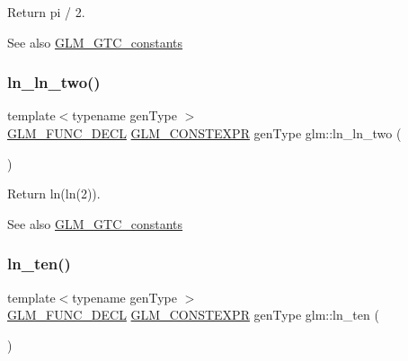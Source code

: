Return pi / 2. \begin{DoxySeeAlso}{See also}
\mbox{\hyperlink{group__gtc__constants}{G\+L\+M\+\_\+\+G\+T\+C\+\_\+constants}} 
\end{DoxySeeAlso}
\mbox{\label{group__gtc__constants_gaca94292c839ed31a405ab7a81ae7e850}} 
\subsubsection{\texorpdfstring{ln\+\_\+ln\+\_\+two()}{ln\_ln\_two()}}
{\footnotesize\ttfamily template$<$typename gen\+Type $>$ \\
\mbox{\hyperlink{setup_8hpp_ab2d052de21a70539923e9bcbf6e83a51}{G\+L\+M\+\_\+\+F\+U\+N\+C\+\_\+\+D\+E\+CL}} \mbox{\hyperlink{setup_8hpp_a08b807947b47031d3a511f03f89645ad}{G\+L\+M\+\_\+\+C\+O\+N\+S\+T\+E\+X\+PR}} gen\+Type glm\+::ln\+\_\+ln\+\_\+two (\begin{DoxyParamCaption}{ }\end{DoxyParamCaption})}

Return ln(ln(2)). \begin{DoxySeeAlso}{See also}
\mbox{\hyperlink{group__gtc__constants}{G\+L\+M\+\_\+\+G\+T\+C\+\_\+constants}} 
\end{DoxySeeAlso}
\mbox{\label{group__gtc__constants_gaf97ebc6c059ffd788e6c4946f71ef66c}} 
\subsubsection{\texorpdfstring{ln\+\_\+ten()}{ln\_ten()}}
{\footnotesize\ttfamily template$<$typename gen\+Type $>$ \\
\mbox{\hyperlink{setup_8hpp_ab2d052de21a70539923e9bcbf6e83a51}{G\+L\+M\+\_\+\+F\+U\+N\+C\+\_\+\+D\+E\+CL}} \mbox{\hyperlink{setup_8hpp_a08b807947b47031d3a511f03f89645ad}{G\+L\+M\+\_\+\+C\+O\+N\+S\+T\+E\+X\+PR}} gen\+Type glm\+::ln\+\_\+ten (\begin{DoxyParamCaption}{ }\end{DoxyParamCaption})}

